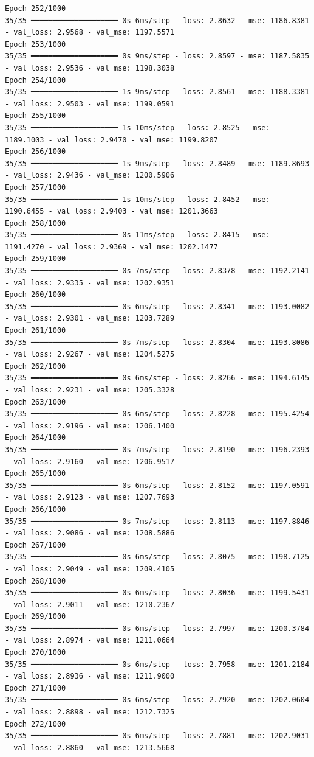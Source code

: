 \documentclass[
  letterpaper,
  DIV=11,
  numbers=noendperiod]{scrreprt}
\begin{document}
\begin{verbatim}
Epoch 252/1000
35/35 ━━━━━━━━━━━━━━━━━━━━ 0s 6ms/step - loss: 2.8632 - mse: 1186.8381 - val_loss: 2.9568 - val_mse: 1197.5571
Epoch 253/1000
35/35 ━━━━━━━━━━━━━━━━━━━━ 0s 9ms/step - loss: 2.8597 - mse: 1187.5835 - val_loss: 2.9536 - val_mse: 1198.3038
Epoch 254/1000
35/35 ━━━━━━━━━━━━━━━━━━━━ 1s 9ms/step - loss: 2.8561 - mse: 1188.3381 - val_loss: 2.9503 - val_mse: 1199.0591
Epoch 255/1000
35/35 ━━━━━━━━━━━━━━━━━━━━ 1s 10ms/step - loss: 2.8525 - mse: 1189.1003 - val_loss: 2.9470 - val_mse: 1199.8207
Epoch 256/1000
35/35 ━━━━━━━━━━━━━━━━━━━━ 1s 9ms/step - loss: 2.8489 - mse: 1189.8693 - val_loss: 2.9436 - val_mse: 1200.5906
Epoch 257/1000
35/35 ━━━━━━━━━━━━━━━━━━━━ 1s 10ms/step - loss: 2.8452 - mse: 1190.6455 - val_loss: 2.9403 - val_mse: 1201.3663
Epoch 258/1000
35/35 ━━━━━━━━━━━━━━━━━━━━ 0s 11ms/step - loss: 2.8415 - mse: 1191.4270 - val_loss: 2.9369 - val_mse: 1202.1477
Epoch 259/1000
35/35 ━━━━━━━━━━━━━━━━━━━━ 0s 7ms/step - loss: 2.8378 - mse: 1192.2141 - val_loss: 2.9335 - val_mse: 1202.9351
Epoch 260/1000
35/35 ━━━━━━━━━━━━━━━━━━━━ 0s 6ms/step - loss: 2.8341 - mse: 1193.0082 - val_loss: 2.9301 - val_mse: 1203.7289
Epoch 261/1000
35/35 ━━━━━━━━━━━━━━━━━━━━ 0s 7ms/step - loss: 2.8304 - mse: 1193.8086 - val_loss: 2.9267 - val_mse: 1204.5275
Epoch 262/1000
35/35 ━━━━━━━━━━━━━━━━━━━━ 0s 6ms/step - loss: 2.8266 - mse: 1194.6145 - val_loss: 2.9231 - val_mse: 1205.3328
Epoch 263/1000
35/35 ━━━━━━━━━━━━━━━━━━━━ 0s 6ms/step - loss: 2.8228 - mse: 1195.4254 - val_loss: 2.9196 - val_mse: 1206.1400
Epoch 264/1000
35/35 ━━━━━━━━━━━━━━━━━━━━ 0s 7ms/step - loss: 2.8190 - mse: 1196.2393 - val_loss: 2.9160 - val_mse: 1206.9517
Epoch 265/1000
35/35 ━━━━━━━━━━━━━━━━━━━━ 0s 6ms/step - loss: 2.8152 - mse: 1197.0591 - val_loss: 2.9123 - val_mse: 1207.7693
Epoch 266/1000
35/35 ━━━━━━━━━━━━━━━━━━━━ 0s 7ms/step - loss: 2.8113 - mse: 1197.8846 - val_loss: 2.9086 - val_mse: 1208.5886
Epoch 267/1000
35/35 ━━━━━━━━━━━━━━━━━━━━ 0s 6ms/step - loss: 2.8075 - mse: 1198.7125 - val_loss: 2.9049 - val_mse: 1209.4105
Epoch 268/1000
35/35 ━━━━━━━━━━━━━━━━━━━━ 0s 6ms/step - loss: 2.8036 - mse: 1199.5431 - val_loss: 2.9011 - val_mse: 1210.2367
Epoch 269/1000
35/35 ━━━━━━━━━━━━━━━━━━━━ 0s 6ms/step - loss: 2.7997 - mse: 1200.3784 - val_loss: 2.8974 - val_mse: 1211.0664
Epoch 270/1000
35/35 ━━━━━━━━━━━━━━━━━━━━ 0s 6ms/step - loss: 2.7958 - mse: 1201.2184 - val_loss: 2.8936 - val_mse: 1211.9000
Epoch 271/1000
35/35 ━━━━━━━━━━━━━━━━━━━━ 0s 6ms/step - loss: 2.7920 - mse: 1202.0604 - val_loss: 2.8898 - val_mse: 1212.7325
Epoch 272/1000
35/35 ━━━━━━━━━━━━━━━━━━━━ 0s 6ms/step - loss: 2.7881 - mse: 1202.9031 - val_loss: 2.8860 - val_mse: 1213.5668

\end{verbatim}
\end{document}
